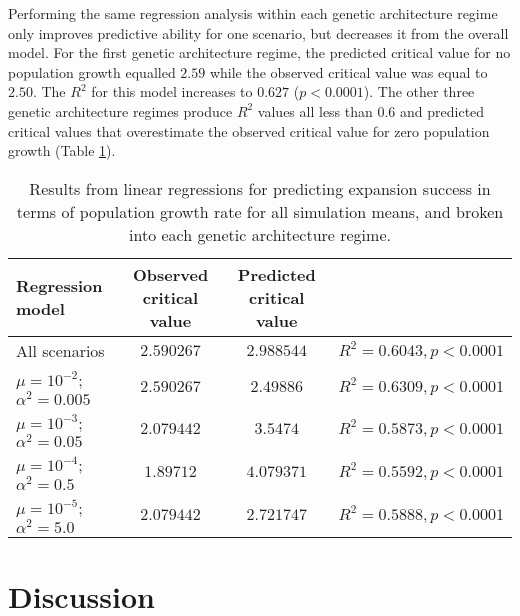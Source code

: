 Performing the same regression analysis within each genetic architecture regime only improves predictive ability for one scenario, but decreases it from the overall model. For the first genetic architecture regime, the predicted critical value for no population growth equalled $2.59$ while the observed critical value was equal to $2.50$. The $R^2$ for this model increases to $0.627$ ($p < 0.0001$). The other three genetic architecture regimes produce $R^2$ values all less than $0.6$ and predicted critical values that overestimate the observed critical value for zero population growth (Table \ref{tab:linearmodels}).

\begin{table}[h]
\centering \footnotesize
\caption[Linear regression for predicting expansion success]{Results from linear regressions for predicting expansion success in terms of population growth rate for all simulation means, and broken into each genetic architecture regime.}
\label{tab:linearmodels}
\begin{tabular}{lccc}
Regression model				&	Observed critical value	&	Predicted critical value	&   \\ \hline \hline
All scenarios					& $2.590267$	& $2.988544$	&	$R^2 = 0.6043, p < 0.0001$	\\  \hline
$\mu = 10^{-2}$; $\alpha^2 = 0.005$	& $2.590267$	& $2.49886$	&	$R^2 = 0.6309, p < 0.0001$	\\  \hline
$\mu = 10^{-3}$; $\alpha^2 = 0.05$	& $2.079442$	& $3.5474$	&	$R^2 = 0.5873, p < 0.0001$	\\ \hline
$\mu = 10^{-4}$; $\alpha^2 = 0.5$	& $1.89712$	& $4.079371$	&	$R^2 = 0.5592, p < 0.0001$	\\ \hline
$\mu = 10^{-5}$; $\alpha^2 = 5.0$	& $2.079442$	& $2.721747$	&	$R^2 = 0.5888, p < 0.0001$	\\ \hline
\end{tabular}
\end{table}






\section{Discussion}


